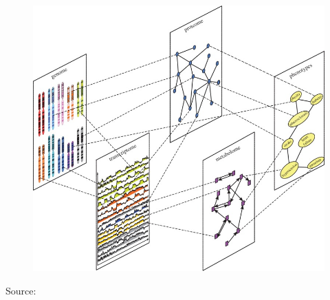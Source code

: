 \documentclass[10pt]{beamer}
\theoremstyle{definition}
\begin{document}
\begin{frame}

\begin{figure}
\centering
\includegraphics[height=.9\textheight]{data_integration_schematic}
\end{figure}

{\center
{\scriptsize Source: {\colr \cite{GligPrzulj15}}}
}
\end{frame}
\end{document}
